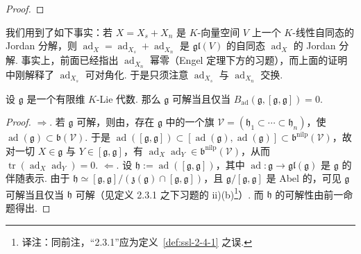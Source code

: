 \begin{numpara}
\begin{proof}
\end{proof}
\begin{remark*}
我们用到了如下事实：若 $X = X_s + X_n$ 是 $K$-向量空间 $V$ 上一个 $K$-线性自同态的 Jordan 分解，则 $\operatorname{ad}_X = \operatorname{ad}_{X_s} + \operatorname{ad}_{X_n}$ 是 $\mathfrak{gl}(V)$ 的自同态 $\operatorname{ad}_X$ 的 Jordan 分解. 事实上，前面已经指出 $\operatorname{ad}_{X_n}$ 幂零（Engel 定理下方的习题），而上面的证明中刚解释了 $\operatorname{ad}_{X_s}$ 可对角化. 于是只须注意 $\operatorname{ad}_{X_s}$ 与 $\operatorname{ad}_{X_n}$ 交换.
\end{remark*}
\begin{corollary*}[Cartan 判据]
设 $\mathfrak{g}$ 是一个有限维 $K$-Lie 代数. 那么 $\mathfrak{g}$ 可解当且仅当 $B_{\mathrm{ad}}(\mathfrak{g}, [\mathfrak{g}, \mathfrak{g}]) = 0$.
\end{corollary*}
\begin{proof}
$\Rightarrow$. 若 $\mathfrak{g}$ 可解，则由，存在 $\mathfrak{g}$ 中的一个旗 $\mathcal{V} = (\mathfrak{h}_1 \subset \cdots \subset \mathfrak{h}_n)$，使 $\operatorname{ad}(\mathfrak{g}) \subset \mathfrak{b}(\mathcal{V})$. 于是 $\operatorname{ad}([\mathfrak{g}, \mathfrak{g}]) \subset [\operatorname{ad}(\mathfrak{g}), \operatorname{ad}(\mathfrak{g})] \subset \mathfrak{b}^{\mathrm{nilp}}(\mathcal{V})$，故对一切 $X \in \mathfrak{g}$ 与 $Y \in [\mathfrak{g}, \mathfrak{g}]$，有 $\operatorname{ad}_X \operatorname{ad}_Y \in \mathfrak{b}^{\mathrm{nilp}}(\mathcal{V})$，从而 $\operatorname{tr}(\operatorname{ad}_X \operatorname{ad}_Y) = 0$.
$\Leftarrow$. 设 $\mathfrak{h} := \operatorname{ad}([\mathfrak{g}, \mathfrak{g}])$，其中 $\operatorname{ad} : \mathfrak{g} \longrightarrow \mathfrak{gl}(\mathfrak{g})$ 是 $\mathfrak{g}$ 的伴随表示. 由于 $\mathfrak{h} \simeq [\mathfrak{g}, \mathfrak{g}]/(\mathfrak{z}(\mathfrak{g}) \cap [\mathfrak{g}, \mathfrak{g}])$，且 $\mathfrak{g}/[\mathfrak{g}, \mathfrak{g}]$ 是 Abel 的，可见 $\mathfrak{g}$ 可解当且仅当 $\mathfrak{h}$ 可解（见定义 2.3.1 之下习题的 ii)(b)\footnote{译注：同前注，``2.3.1''应为定义~\ref{def:ssl-2-4-1} 之误.}）. 而 $\mathfrak{h}$ 的可解性由前一命题得出.
\end{proof}
\end{numpara}
